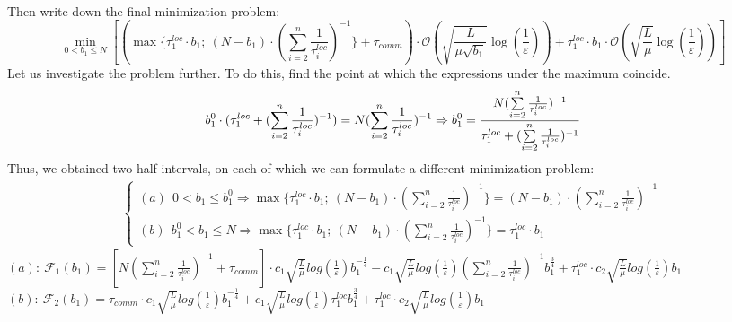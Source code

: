 \documentclass{article}
\begin{document}
\\ Then write down the final minimization problem:
\begin{equation}
     \label{eq:fm2}
    \underset{0 < b_1 \leq N}{\min}[(\max\{\tau_1^{loc}\cdot b_1; ~(N-b_1) \cdot (\sum\limits_{i = 2}^{n} \frac{1}{\tau_i^{loc}} )^{-1}\} + \tau_{comm}) \cdot \mathcal O(\sqrt{\frac{L}{\mu \sqrt{b_1}}}\log(\frac{1}{\varepsilon})) + \tau_1^{loc}\cdot b_1 \cdot \mathcal O(\sqrt{\frac{L}{\mu}}\log(\frac{1}{\varepsilon}))] 
\end{equation}
Let us investigate the problem further. To do this, find the point at which the expressions under the maximum coincide. 
\begin{equation}
    \notag
    b_1^0 \cdot (\tau_1^{loc} + (\sum\limits_{i = 2}^{n} \frac{1}{\tau_i^{loc}})^{-1}) = N (\sum\limits_{i = 2}^{n} \frac{1}{\tau_i^{loc}})^{-1} \Rightarrow b_1^0 = \frac{N (\sum\limits_{i = 2}^{n} \frac{1}{\tau_i^{loc}})^{-1}}{\tau_1^{loc} + (\sum\limits_{i = 2}^{n} \frac{1}{\tau_i^{loc}})^{-1}}
\end{equation}
Thus, we obtained two half-intervals, on each of which we can formulate a different minimization problem:
\begin{eqnarray}
\label{half-int}
    \begin{cases}
    (a) ~ ~ 0 < b_1 \leq b_1^0 \Rightarrow \max\{\tau_1^{loc}\cdot b_1; ~(N-b_1) \cdot (\sum\limits_{i = 2}^{n} \frac{1}{\tau_i^{loc}} )^{-1}\} = 
    (N-b_1) \cdot (\sum\limits_{i = 2}^{n} \frac{1}{\tau_i^{loc}})^{-1}
    \\
    (b) ~ ~ b_1^0 <  b_1 \leq N \Rightarrow \max\{\tau_1^{loc}\cdot b_1; ~(N-b_1) \cdot (\sum\limits_{i = 2}^{n} \frac{1}{\tau_i^{loc}} )^{-1}\} = \tau_1^{loc}\cdot b_1
    \end{cases}\,
\end{eqnarray}
$(a): ~\mathcal{F}_1(b_1) = [N (\sum\limits_{i = 2}^{n} \frac{1}{\tau_i^{loc}})^{-1} + \tau_{comm}]\cdot 
c_1 \sqrt{\frac{L}{\mu}}log (\frac{1}{\varepsilon})  b_1^{-\frac{1}{4}} - 
c_1  \sqrt{\frac{L}{\mu}}log (\frac{1}{\varepsilon})(\sum\limits_{i =
2}^{n} \frac{1}{\tau_i^{loc}})^{-1} b_1^{\frac{3}{4}}  + \tau_1^{loc}\cdot c_2  \sqrt{\frac{L}{\mu}}log (\frac{1}{\varepsilon}) b_1 $\\
$(b): ~\mathcal{F}_2(b_1) = \tau_{comm}\cdot 
c_1 \sqrt{\frac{L}{\mu}}log (\frac{1}{\varepsilon})  b_1^{-\frac{1}{4}} + 
c_1  \sqrt{\frac{L}{\mu}}log (\frac{1}{\varepsilon})\tau_1^{loc} b_1^{\frac{3}{4}}  + \tau_1^{loc}\cdot c_2  \sqrt{\frac{L}{\mu}}log (\frac{1}{\varepsilon}) b_1 $
\\
\end{document}
